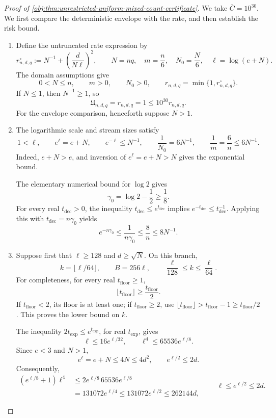 \documentclass[11pt]{article}
\begin{document}
\begin{proof}[Proof of \cref{obj:thm:unrestricted-uniform-mixed-count-certificate}]
We take \(\overline C=10^{30}\). We first compare the deterministic envelope with the rate, and then establish the risk bound.

\begin{enumerate}
\item Define the untruncated rate expression by
\[
r^\circ_{n,d,q}
:=N^{-1}+\left(\frac{d}{N\ell}\right)^2,
\qquad
N=nq,\quad m=\frac n6,\quad N_0=\frac N6,
\quad \ell=\log(e+N).
\]
The domain assumptions give
\[
0<N\le n,\qquad m>0,\qquad N_0>0,
\qquad r_{n,d,q}=\min\{1,r^\circ_{n,d,q}\}.
\]
If \(N\le1\), then \(N^{-1}\ge1\), so
\[
\mathfrak U_{n,d,q}=r_{n,d,q}=1
\le10^{30}r_{n,d,q}.
\]
For the envelope comparison, henceforth suppose \(N>1\).

\item The logarithmic scale and stream sizes satisfy
\[
1<\ell,\qquad e^\ell=e+N,\qquad e^{-\ell}\le N^{-1},
\qquad
\frac1{N_0}=6N^{-1},\qquad
\frac1m=\frac6n\le6N^{-1}.
\]
Indeed, \(e+N>e\), and inversion of \(e^\ell=e+N>N\) gives the exponential bound.

The elementary numerical bound for \(\log2\) gives
\[
\gamma_0=\log2-\frac12\ge\frac18.
\]
For every real \(t_{\mathrm{dec}}>0\), the inequality
\(t_{\mathrm{dec}}\le e^{t_{\mathrm{dec}}}\) implies
\(e^{-t_{\mathrm{dec}}}\le t_{\mathrm{dec}}^{-1}\). Applying this with
\(t_{\mathrm{dec}}=n\gamma_0\) yields
\[
e^{-n\gamma_0}
\le\frac1{n\gamma_0}
\le\frac8n
\le8N^{-1}.
\]

\item Suppose first that \(\ell\ge128\) and \(d\ge\sqrt N\). On this branch,
\[
k=\lfloor\ell/64\rfloor,\qquad B=256\ell,
\qquad
\frac{\ell}{128}\le k\le\frac{\ell}{64}.
\]
For completeness, for every real \(t_{\mathrm{floor}}\ge1\),
\[
\lfloor t_{\mathrm{floor}}\rfloor\ge\frac{t_{\mathrm{floor}}}{2}.
\]
If \(t_{\mathrm{floor}}<2\), its floor is at least one; if
\(t_{\mathrm{floor}}\ge2\), use
\(\lfloor t_{\mathrm{floor}}\rfloor>t_{\mathrm{floor}}-1
\ge t_{\mathrm{floor}}/2\). This proves the lower bound on \(k\).

The inequality \(2t_{\mathrm{exp}}\le e^{t_{\mathrm{exp}}}\), for real
\(t_{\mathrm{exp}}\), gives
\[
\ell\le16e^{\ell/32},
\qquad
\ell^4\le65536e^{\ell/8}.
\]
Since \(e<3\) and \(N>1\),
\[
e^\ell=e+N\le4N\le4d^2,
\qquad e^{\ell/2}\le2d.
\]
Consequently,
\[
\begin{aligned}
(e^{\ell/8}+1)\ell^4
&\le2e^{\ell/8}\,65536e^{\ell/8}\\
&=131072e^{\ell/4}
\le131072e^{\ell/2}
\le262144d,
\end{aligned}
\qquad
\ell\le e^{\ell/2}\le2d.
\]


\end{enumerate}
\end{proof}
\end{document}
